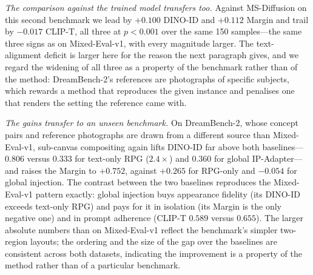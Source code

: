 \documentclass[10pt,twocolumn,letterpaper]{article}
\begin{document}
\begin{table}[htbp]
\centering
\caption{%
  \textbf{DreamBench-2 results} (150 two-concept samples from
  DreamBench++~\cite{peng2025dreambench}, $1024\times1024$).
  Ours is evaluated here at $\tau{=}1$, which is the weaker setting on
  every identity axis (Table~\ref{tab:tau}), so these numbers understate
  the method relative to its default $\tau{=}0.7$.%
}
\label{tab:dreambench2}
\end{table}

\noindent\textit{The comparison against the trained model transfers too.}
Against MS-Diffusion on this second benchmark we lead by $+0.100$ DINO-ID and
$+0.112$ Margin and trail by $-0.017$ CLIP-T, all three at $p{<}0.001$ over
the same 150 samples---the same three signs as on Mixed-Eval-v1, with every
magnitude larger.  The text-alignment deficit is larger here for the reason
the next paragraph gives, and we regard the widening of all three as a
property of the benchmark rather than of the method: DreamBench-2's
references are photographs of specific subjects, which rewards a method that
reproduces the given instance and penalises one that renders the setting the
reference came with.

\noindent\textit{The gains transfer to an unseen benchmark.}
On DreamBench-2, whose concept pairs and reference photographs are drawn
from a different source than Mixed-Eval-v1, sub-canvas compositing again
lifts DINO-ID far above both baselines---$0.806$ versus $0.333$ for
text-only RPG ($2.4\times$) and $0.360$ for global IP-Adapter---and
raises the Margin to $+0.752$, against $+0.265$ for RPG-only and
$-0.054$ for global injection.  The contrast between the two baselines
reproduces the Mixed-Eval-v1 pattern exactly: global injection buys
appearance fidelity (its DINO-ID exceeds text-only RPG) and pays for it
in isolation (its Margin is the only negative one) and in prompt
adherence (CLIP-T $0.589$ versus $0.655$).  The larger absolute numbers
than on Mixed-Eval-v1 reflect the benchmark's simpler two-region
layouts; the ordering and the size of the gap over the baselines are
consistent across both datasets, indicating the improvement is a
property of the method rather than of a particular benchmark.
\end{document}

